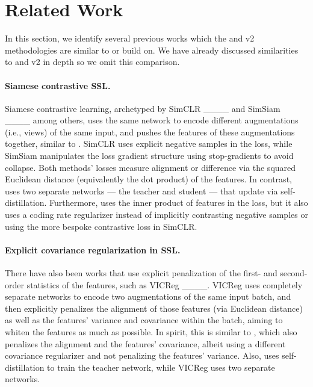 \section{Related Work}
\label{sec:related_work}

In this section, we identify several previous works which the \simdino{} and \simdino{}v2 methodologies are similar to or build on. We have already discussed similarities to \dino{} and \dino{}v2 in depth so we omit this comparison.


\paragraph{Siamese contrastive SSL.} Siamese contrastive learning, archetyped by SimCLR ____ and SimSiam ____ among others, uses the same network to encode different augmentations (i.e., views) of the same input, and pushes the features of these augmentations together, similar to \simdino{}. SimCLR uses explicit negative samples in the loss, while SimSiam manipulates the loss gradient structure using stop-gradients to avoid collapse. Both methods' losses measure alignment or difference via the squared Euclidean distance (equivalently the dot product) of the features. In contrast, \simdino{} uses two separate networks --- the teacher and student --- that update via self-distillation. Furthermore, \simdino{} uses the inner product of features in the loss, but it also uses a coding rate regularizer instead of implicitly contrasting negative samples or using the more bespoke contrastive loss in SimCLR.


\paragraph{Explicit covariance regularization in SSL.} There have also been works that use explicit penalization of the first- and second-order statistics of the features, such as VICReg ____. VICReg uses completely separate networks to encode two augmentations of the same input batch, and then explicitly penalizes the alignment of those features (via Euclidean distance) as well as the features' variance and covariance within the batch, aiming to whiten the features as much as possible. In spirit, this is similar to \simdino{}, which also penalizes the alignment and the features' covariance, albeit using a different covariance regularizer and not penalizing the features' variance. Also, \simdino{} uses self-distillation to train the teacher network, while VICReg uses two separate networks.



